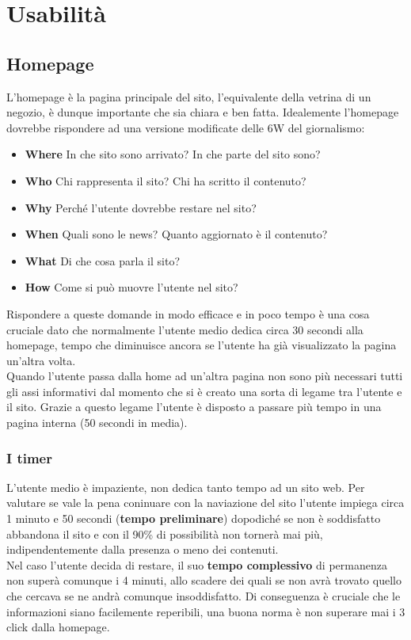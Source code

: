 \section{Usabilità}

\subsection{Homepage}
L'homepage è la pagina principale del sito, l'equivalente della vetrina di un negozio, è dunque importante che sia chiara e ben fatta.
Idealemente l'homepage dovrebbe rispondere ad una versione modificate delle 6W del giornalismo:
\begin{itemize}
\item \textbf{Where} In che sito sono arrivato? In che parte del sito sono?
\item \textbf{Who} Chi rappresenta il sito? Chi ha scritto il contenuto?
\item \textbf{Why} Perché l'utente dovrebbe restare nel sito?
\item \textbf{When} Quali sono le news? Quanto aggiornato è il contenuto?
\item \textbf{What} Di che cosa parla il sito?
\item \textbf{How} Come si può muovre l'utente nel sito?
\end{itemize}
Rispondere a queste domande in modo efficace e in poco tempo è una cosa cruciale dato che normalmente l'utente medio dedica circa 30 secondi alla homepage, tempo che diminuisce ancora se l'utente ha già visualizzato la pagina un'altra volta.
\\
Quando l'utente passa dalla home ad un'altra pagina non sono più necessari tutti gli assi informativi dal momento che si è creato una sorta di legame tra l'utente e il sito.
Grazie a questo legame l'utente è disposto a passare più tempo in una pagina interna (50 secondi in media).

\subsubsection{I timer}
L'utente medio è impaziente, non dedica tanto tempo ad un sito web. Per valutare se vale la pena coninuare con la naviazione del sito l'utente impiega circa 1 minuto e 50 secondi (\textbf{tempo preliminare}) dopodiché se non è soddisfatto abbandona il sito e con il 90\% di possibilità non tornerà mai più, indipendentemente dalla presenza o meno dei contenuti.
\\
Nel caso l'utente decida di restare, il suo \textbf{tempo complessivo} di permanenza non superà comunque i 4 minuti, allo scadere dei quali se non avrà trovato quello che cercava se ne andrà comunque insoddisfatto. Di conseguenza è cruciale che le informazioni siano facilemente reperibili, una buona norma è non superare mai i 3 click dalla homepage.

